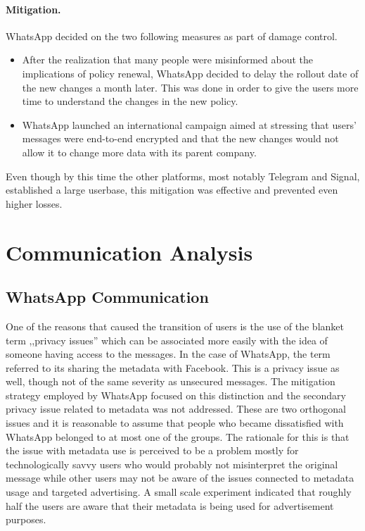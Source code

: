 \paragraph{Mitigation.}
WhatsApp decided on the two following measures as part of damage control.

\begin{itemize}
\item
After the realization that many people were misinformed about the implications of policy renewal, WhatsApp decided to delay the rollout date of the new changes a month later.
This was done in order to give the users more time to understand the changes in the new policy.
\item
WhatsApp launched an international campaign aimed at stressing that users' messages were end-to-end encrypted and that the new changes would not allow it to change more data with its parent company.
\end{itemize}

Even though by this time the other platforms, most notably Telegram and Signal, established a large userbase, this mitigation was effective and prevented even higher losses.

\section{Communication Analysis} \label{sec:analysis}

\subsection{WhatsApp Communication}

One of the reasons that caused the transition of users is the use of the blanket term ,,privacy issues'' which can be associated more easily with the idea of someone having access to the messages.
In the case of WhatsApp, the term referred to its sharing the metadata with Facebook.
This is a privacy issue as well, though not of the same severity as unsecured messages.
The mitigation strategy employed by WhatsApp focused on this distinction and the secondary privacy issue related to metadata was not addressed.
These are two orthogonal issues and it is reasonable to assume that people who became dissatisfied with WhatsApp belonged to at most one of the groups.
The rationale for this is that the issue with metadata use is perceived to be a problem mostly for technologically savvy users who would probably not misinterpret the original message while other users may not be aware of the issues connected to metadata usage and targeted advertising.
A small scale experiment \citep{dev2018understanding} indicated that roughly half the users are aware that their metadata is being used for advertisement purposes.

